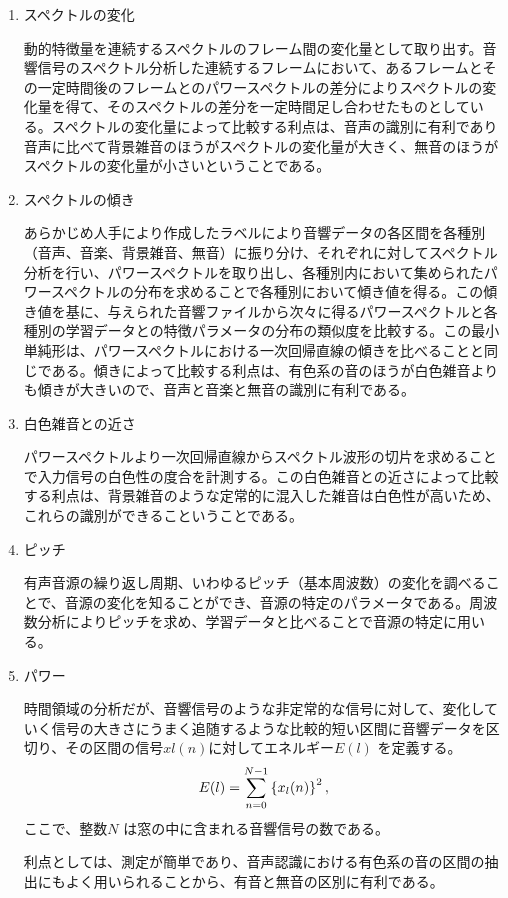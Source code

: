 \begin{enumerate}
\item スペクトルの変化\par
動的特徴量を連続するスペクトルのフレーム間の変化量として取り出す。音響信号のスペクトル分析した連続するフレームにおいて、あるフレームとその一定時間後のフレームとのパワースペクトルの差分によりスペクトルの変化量を得て、そのスペクトルの差分を一定時間足し合わせたものとしている。スペクトルの変化量によって比較する利点は、音声の識別に有利であり音声に比べて背景雑音のほうがスペクトルの変化量が大きく、無音のほうがスペクトルの変化量が小さいということである。

\item スペクトルの傾き\par
あらかじめ人手により作成したラベルにより音響データの各区間を各種別（音声、音楽、背景雑音、無音）に振り分け、それぞれに対してスペクトル分析を行い、パワースペクトルを取り出し、各種別内において集められたパワースペクトルの分布を求めることで各種別において傾き値を得る。この傾き値を基に、与えられた音響ファイルから次々に得るパワースペクトルと各種別の学習データとの特徴パラメータの分布の類似度を比較する。この最小単純形は、パワースペクトルにおける一次回帰直線の傾きを比べることと同じである。傾きによって比較する利点は、有色系の音のほうが白色雑音よりも傾きが大きいので、音声と音楽と無音の識別に有利である。

\item 白色雑音との近さ\par
パワースペクトルより一次回帰直線からスペクトル波形の切片を求めることで入力信号の白色性の度合を計測する。この白色雑音との近さによって比較する利点は、背景雑音のような定常的に混入した雑音は白色性が高いため、これらの識別ができるこということである。

\item ピッチ\par
有声音源の繰り返し周期、いわゆるピッチ（基本周波数）の変化を調べることで、音源の変化を知ることができ、音源の特定のパラメータである。周波数分析によりピッチを求め、学習データと比べることで音源の特定に用いる。

\item パワー\par
時間領域の分析だが、音響信号のような非定常的な信号に対して、変化していく信号の大きさにうまく追随するような比較的短い区間に音響データを区切り、その区間の信号$xl(n)$に対してエネルギー$E(l)$ を定義する\cite{shimae_11}。
\begin{equation}
E(l)=\sum_{n=0}^{N-1}\left\{x_l(n)\right\}^2, \notag
\end{equation}
ここで、整数$N$ は窓の中に含まれる音響信号の数である。\par
利点としては、測定が簡単であり、音声認識における有色系の音の区間の抽出にもよく用いられることから、有音と無音の区別に有利である。


\end{enumerate}
